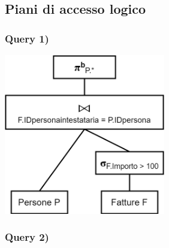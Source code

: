 \documentclass[a4paper,12pt]{article}
\begin{document}
 \subsection{ Piani di accesso logico }

 \subsubsection{ Query 1) }

\begin{minipage}{\textwidth}
\begin{multicols}{2}

\null \vfill

\vfill \null

\columnbreak

\includegraphics[height=7cm]{ Albero logico 1.png }

\end{multicols}
\end{minipage}

 \subsubsection{ Query 2) }
\end{document}
